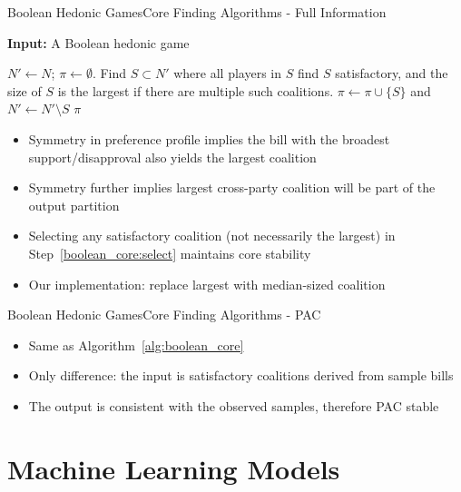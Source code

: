 \documentclass[xcolor=dvipsnames]{beamer}
\begin{document}
\begin{frame}{Boolean Hedonic Games}{Core Finding Algorithms - Full Information}
  \begin{algorithm}[H]
    \scriptsize
    \caption{Boolean Hedonic Game Core Finding Algorithm}
    \label{alg:boolean_core}
    \textbf{Input:} A Boolean hedonic game
    \begin{algorithmic}[1]

    \State $N' \leftarrow N$; $\pi \leftarrow \emptyset$.
      \State \label{boolean_core:select} Find $S \subset N'$ where all players
        in $S$ find $S$ satisfactory, and the size of $S$ is the largest if there
        are multiple such coalitions.
      \State $\pi \leftarrow \pi \cup \lbrace S \rbrace$ and
        $N' \leftarrow  N' \setminus S$
    \EndWhile
    \State \Return $\pi$

    \end{algorithmic}
  \end{algorithm}

  \scriptsize
  \begin{itemize}
    \item Symmetry in preference profile implies the bill with the broadest support/disapproval also yields the largest coalition
    \item Symmetry further implies largest cross-party coalition will be part of the output partition
    \item Selecting any satisfactory coalition (not necessarily the largest) in Step~\ref{boolean_core:select} maintains core stability
    \item Our implementation: replace largest with median-sized coalition
  \end{itemize}
\end{frame}


\begin{frame}{Boolean Hedonic Games}{Core Finding Algorithms - PAC}
  \begin{itemize}
    \item Same as Algorithm~\ref{alg:boolean_core}
    \item Only difference: the input is satisfactory coalitions derived from sample bills
    \item The output is consistent with the observed samples, therefore PAC stable \cite{jha2019learning}
  \end{itemize}
\end{frame}

\section{Machine Learning Models}
\end{document}
